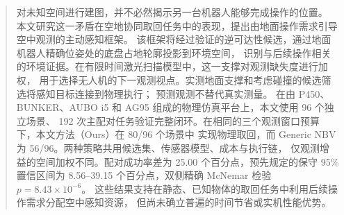 \begin{abstract}
对未知空间进行建图，并不必然揭示另一台机器人能够完成操作的位置。
本文研究这一矛盾在空地协同取回任务中的表现，提出由地面操作需求引导空中观测的主动感知框架。
该框架将经过验证的逆可达性候选，通过地面机器人精确位姿处的底盘占地轮廓投影到环境空间，
识别与后续操作相关的环境证据。在有限时间激光扫描模型中，这一支撑对观测缺失度进行加权，
用于选择无人机的下一观测视点。实测地面支撑和考虑碰撞的候选筛选将感知目标连接到物理执行；
预测观测不替代真实测量。
在由 P450、BUNKER、AUBO i5 和 AG95 组成的物理仿真平台上，本文使用 96 个独立场景、
192 次主配对任务验证完整闭环。在相同的三个观测窗口预算下，本文方法（Ours）在 80/96 个场景中
实现物理取回，而 Generic NBV 为 56/96。两种策略共用候选集、传感器模型、成本与执行链，
仅观测增益的空间加权不同。配对成功率差为 25.00 个百分点，预先规定的保守 95\% 置信区间为
8.56--39.15 个百分点，双侧精确 McNemar 检验 $p=8.43\times10^{-6}$。
这些结果支持在静态、已知物体的取回任务中利用后续操作需求分配空中感知资源，
但尚未确立普遍的时间节省或实机性能优势。
\end{abstract}

